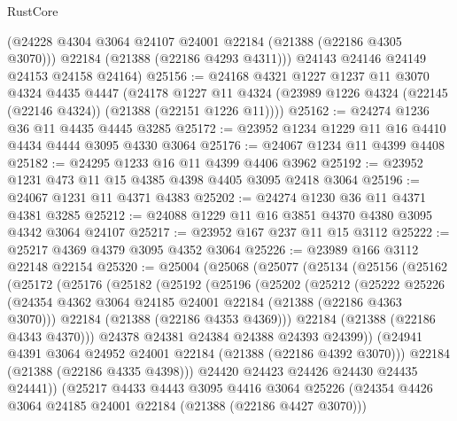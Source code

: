\begin{lexlean}{RustCore}
\begin{coremodule}
        (@24228 @4304 @3064 @24107 @24001 @22184 (@21388 (@22186 @4305 @3070)))
        @22184
        (@21388 (@22186 @4293 @4311)))
      @24143
      @24146
      @24149
      @24153
      @24158
      @24164)
@25156 := @24168
    @4321
    @1227
    @1237
    @11
    @3070
    @4324
    @4435
    @4447
    (@24178
      @1227
      @11
      @4324
      (@23989 @1226 @4324 (@22145 (@22146 @4324)) (@21388 (@22151 @1226 @11))))
@25162 := @24274 @1236 @36 @11 @4435 @4445 @3285
@25172 := @23952 @1234 @1229 @11 @16 @4410 @4434 @4444 @3095 @4330 @3064
@25176 := @24067 @1234 @11 @4399 @4408
@25182 := @24295 @1233 @16 @11 @4399 @4406 @3962
@25192 := @23952 @1231 @473 @11 @15 @4385 @4398 @4405 @3095 @2418 @3064
@25196 := @24067 @1231 @11 @4371 @4383
@25202 := @24274 @1230 @36 @11 @4371 @4381 @3285
@25212 := @24088 @1229 @11 @16 @3851 @4370 @4380 @3095 @4342 @3064 @24107
@25217 := @23952 @167 @237 @11 @15 @3112
@25222 := @25217 @4369 @4379 @3095 @4352 @3064
@25226 := @23989 @166 @3112 @22148 @22154
@25320 := @25004
    (@25068
      (@25077
        (@25134
          (@25156
            (@25162
              (@25172
                (@25176
                  (@25182
                    (@25192
                      (@25196
                        (@25202
                          (@25212
                            (@25222
                              @25226
                              (@24354
                                @4362
                                @3064
                                @24185
                                @24001
                                @22184
                                (@21388 (@22186 @4363 @3070)))
                              @22184
                              (@21388 (@22186 @4353 @4369)))
                            @22184
                            (@21388 (@22186 @4343 @4370)))
                          @24378
                          @24381
                          @24384
                          @24388
                          @24393
                          @24399))
                      (@24941 @4391 @3064 @24952 @24001 @22184 (@21388 (@22186 @4392 @3070)))
                      @22184
                      (@21388 (@22186 @4335 @4398)))
                    @24420
                    @24423
                    @24426
                    @24430
                    @24435
                    @24441))
                (@25217
                  @4433
                  @4443
                  @3095
                  @4416
                  @3064
                  @25226
                  (@24354 @4426 @3064 @24185 @24001 @22184 (@21388 (@22186 @4427 @3070)))

\end{coremodule}
\end{lexlean}
